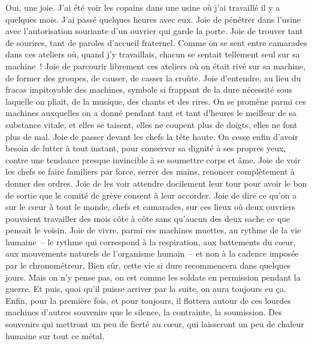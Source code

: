 \documentclass[french,twoside]{book} %
\begin{document}
Oui, une joie. J'ai été voir les copains dans une usine où j'ai travaillé il y a quelques mois. J'ai passé quelques heures avec eux. Joie de pénétrer dans l'usine avec l'autorisation souriante d'un ouvrier qui garde la porte. Joie de trouver tant de sourires, tant de paroles d'accueil fraternel. Comme on se sent entre camarades dans ces ateliers où, quand j'y travaillais, chacun se sentait tellement seul sur sa machine ! Joie de parcourir librement ces ateliers où on était rivé sur sa machine, de former des groupes, de causer, de casser la croûte. Joie d'entendre, au lieu du fracas impitoyable des machines, symbole si frappant de la dure nécessité sous laquelle on pliait, de la musique, des chants et des rires. On se promène parmi ces machines auxquelles on a donné pendant tant et tant d'heures le meilleur de sa substance vitale, et elles se taisent, elles ne coupent plus de doigts, elles ne font plus de mal. Joie de passer devant les chefs la tête haute. On cesse enfin d'avoir besoin de lutter à tout instant, pour conserver sa dignité à ses propres yeux, contre une tendance presque invincible à se soumettre corps et âme. Joie de voir les chefs se faire familiers par force, serrer des mains, renoncer complètement à donner des ordres. Joie de les voir attendre docilement leur tour pour avoir le bon de sortie que le comité de grève consent à leur accorder. Joie de dire ce qu'on a sur le cœur à tout le monde, chefs et camarades, sur ces lieux où deux ouvriers pouvaient travailler des mois côte à côte sans qu'aucun des deux sache ce que pensait le voisin. Joie de vivre, parmi ces machines muettes, au rythme de la vie humaine – le rythme qui correspond à la respiration, aux battements du cœur, aux mouvements naturels de l'organisme humain – et non à la cadence imposée par le chronométreur, Bien sûr, cette vie si dure recommencera dans quelques jours. Mais on n'y pense pas, on est comme les soldats en permission pendant la guerre. Et puis, quoi qu'il puisse arriver par la suite, on aura toujours eu ça. Enfin, pour la première fois, et pour toujours, il flottera autour de ces lourdes machines d'autres souvenirs que le silence, la contrainte, la soumission. Des souvenirs qui mettront un peu de fierté au cœur, qui laisseront un peu de chaleur humaine sur tout ce métal.\par
\end{document}
